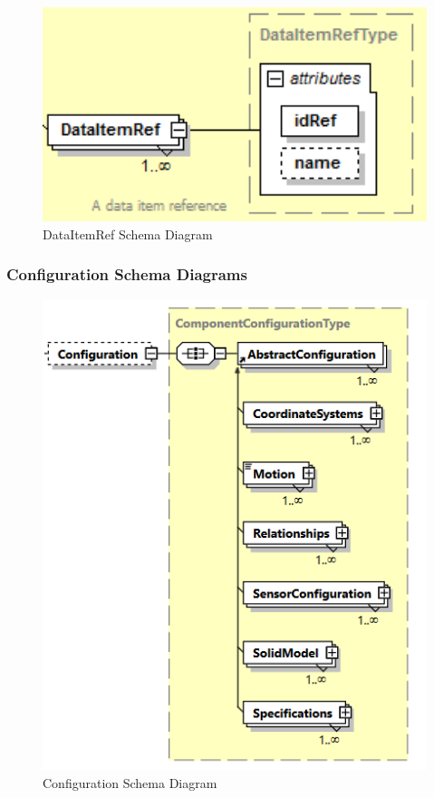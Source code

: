 \begin{figure}[ht]
  \centering
    \includegraphics[width=1.0\textwidth]{figures/DataItemRef Schema.png}
  \caption{DataItemRef Schema Diagram}
  \label{fig:DataItemRef Schema Diagram}
\end{figure}

\FloatBarrier


\subsubsection{Configuration Schema Diagrams}
\label{sec:Configuration Schema Diagrams}

\begin{figure}[ht]
  \centering
    \includegraphics[width=1.0\textwidth]{figures/Configuration Schema.png}
  \caption{Configuration Schema Diagram}
  \label{fig:Configuration Schema Diagram}
\end{figure}

